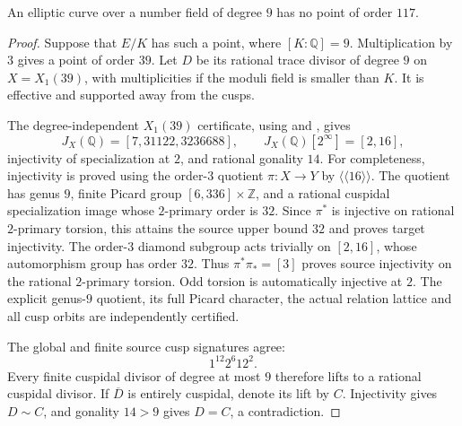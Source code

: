 \begin{proposition}\label{prop:nonic117-exclusion}
An elliptic curve over a number field of degree $9$ has no point of order $117$.
\end{proposition}
\begin{proof}
Suppose that $E/K$ has such a point, where $[K:\mathbb Q]=9$.
Multiplication by $3$ gives a point of order $39$.
Let $D$ be its rational trace divisor of degree $9$ on $X=X_1(39)$, with multiplicities if the moduli field is smaller than $K$.
It is effective and supported away from the cusps.

The degree-independent $X_1(39)$ certificate, using \cite[Theorem~3.1(2), Theorem~4.13 and Table~2]{DEHMZ} and \cite[Table~1]{DvH}, gives
\[
 J_X(\mathbb Q)=[7,31122,3236688],\qquad
 J_X(\mathbb Q)[2^\infty]=[2,16],
\]
injectivity of specialization at $2$, and rational gonality $14$.
For completeness, injectivity is proved using the order-$3$ quotient
$\pi:X\to Y$ by $\langle\langle16\rangle\rangle$.
The quotient has genus $9$, finite Picard group $[6,336]\times\mathbb Z$, and a rational cuspidal specialization image whose $2$-primary order is $32$.
Since $\pi^*$ is injective on rational $2$-primary torsion, this attains the source upper bound $32$ and proves target injectivity.
The order-$3$ diamond subgroup acts trivially on $[2,16]$, whose automorphism group has order $32$.
Thus $\pi^*\pi_*=[3]$ proves source injectivity on the rational $2$-primary torsion.
Odd torsion is automatically injective at $2$.
The explicit genus-$9$ quotient, its full Picard character, the actual relation lattice and all cusp orbits are independently certified.

The global and finite source cusp signatures agree:
\[
 1^{12}2^6 12^2.
\]
Every finite cuspidal divisor of degree at most $9$ therefore lifts to a rational cuspidal divisor.
If $\overline D$ is entirely cuspidal, denote its lift by $C$.
Injectivity gives $D\sim C$, and gonality $14>9$ gives $D=C$, a contradiction.


\end{proof}
